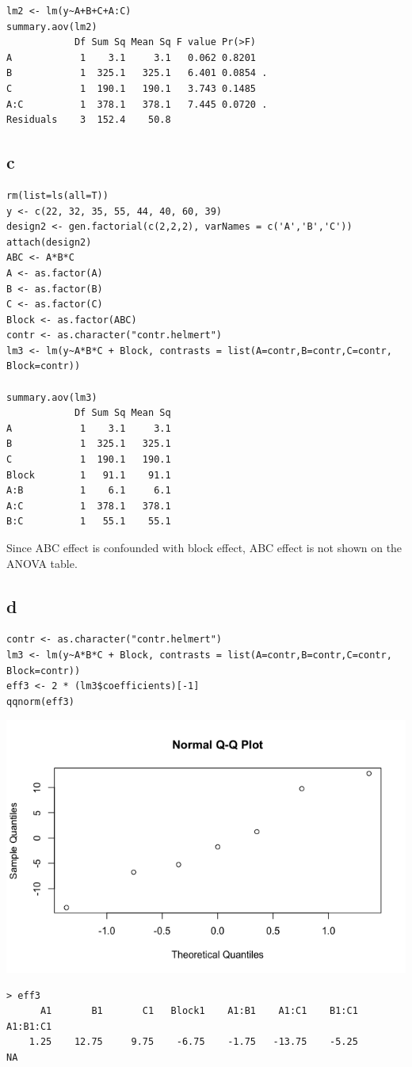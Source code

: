 \documentclass[11pt,letterpaper]{article}
\begin{document}
\begin{verbatim}
lm2 <- lm(y~A+B+C+A:C)
summary.aov(lm2)
            Df Sum Sq Mean Sq F value Pr(>F)  
A            1    3.1     3.1   0.062 0.8201  
B            1  325.1   325.1   6.401 0.0854 .
C            1  190.1   190.1   3.743 0.1485  
A:C          1  378.1   378.1   7.445 0.0720 .
Residuals    3  152.4    50.8 
\end{verbatim}

\subsection*{c}
\begin{verbatim}
rm(list=ls(all=T))
y <- c(22, 32, 35, 55, 44, 40, 60, 39)
design2 <- gen.factorial(c(2,2,2), varNames = c('A','B','C'))
attach(design2)
ABC <- A*B*C
A <- as.factor(A)
B <- as.factor(B)
C <- as.factor(C)
Block <- as.factor(ABC)
contr <- as.character("contr.helmert")
lm3 <- lm(y~A*B*C + Block, contrasts = list(A=contr,B=contr,C=contr, Block=contr))

summary.aov(lm3)
            Df Sum Sq Mean Sq
A            1    3.1     3.1
B            1  325.1   325.1
C            1  190.1   190.1
Block        1   91.1    91.1
A:B          1    6.1     6.1
A:C          1  378.1   378.1
B:C          1   55.1    55.1
\end{verbatim}

\noindent Since ABC effect is confounded with block effect, ABC effect is not shown on the ANOVA table. 

\subsection*{d}
\begin{verbatim}
contr <- as.character("contr.helmert")
lm3 <- lm(y~A*B*C + Block, contrasts = list(A=contr,B=contr,C=contr, Block=contr))
eff3 <- 2 * (lm3$coefficients)[-1]
qqnorm(eff3)
\end{verbatim}
\includegraphics[scale=0.55]{lect18-3-d.png}
\begin{verbatim}
> eff3
      A1       B1       C1   Block1    A1:B1    A1:C1    B1:C1 A1:B1:C1 
    1.25    12.75     9.75    -6.75    -1.75   -13.75    -5.25       NA 
\end{verbatim}
\end{document}
